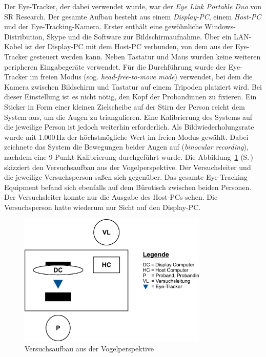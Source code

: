 Der Eye-Tracker, der dabei verwendet wurde, war der \emph{Eye Link Portable Duo} von SR Research. Der gesamte Aufbau besteht aus einem \emph{Display-PC}, einem \emph{Host-PC} und der Eye-Tracking-Kamera. Erster enthält eine gewöhnliche Windows-Distribution, Skype und die Software zur Bildschirmaufnahme. Über ein LAN-Kabel ist der Display-PC mit dem Host-PC verbunden, von dem aus der Eye-Tracker gesteuert werden kann. Neben Tastatur und Maus wurden keine weiteren peripheren Eingabegeräte verwendet. Für die Durchführung wurde der Eye-Tracker im freien Modus (sog. \emph{head-free-to-move mode}) verwendet, bei dem die Kamera zwischen Bildschirm und Tastatur auf einem Tripoden platziert wird. Bei dieser Einstellung ist es nicht nötig, den Kopf der Proband{\textperiodcentered}innen zu fixieren. Ein Sticker in Form einer kleinen Zielscheibe auf der Stirn der Person reicht dem System aus, um die Augen zu triangulieren. Eine Kalibrierung des Systems auf die jeweilige Person ist jedoch weiterhin erforderlich. Als Bildwiederholungsrate wurde mit 1.000\,Hz der höchstmögliche Wert im freien Modus gewählt. Dabei zeichnete das System die Bewegungen beider Augen auf (\emph{binocular recording}), nachdem eine 9-Punkt-Kalibrierung durchgeführt wurde. Die Abbildung~\ref{K5:fig:Skizze-Vogelperspektive} (S.\,\pageref{K5:fig:Skizze-Vogelperspektive}) skizziert den Versuchsaufbau aus der Vogelperspektive. Der Versuchsleiter und die jeweilige Versuchsperson saßen sich gegenüber. Das gesamte Eye-Tracking-Equipment befand sich ebenfalls auf dem Bürotisch zwischen beiden Personen. Der Versuchsleiter konnte nur die Ausgabe des Host-PCs sehen. Die Versuchsperson hatte wiederum nur Sicht auf den Display-PC.


\begin{figure}
    \includegraphics[width=9cm]{Figures/EyeTracking/skizze-versuchsaufbau-vogelperspektive.pdf}
	\caption{Versuchsaufbau aus der Vogelperspektive\label{K5:fig:Skizze-Vogelperspektive}}
\end{figure}


